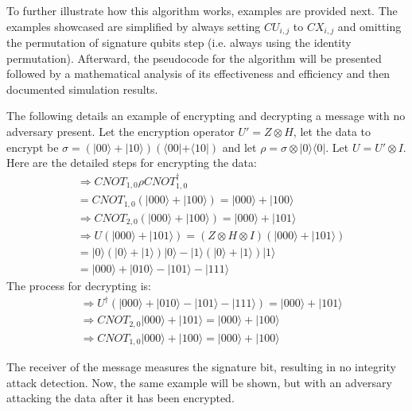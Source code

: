 To further illustrate how this algorithm works, examples are provided next. The examples showcased are simplified by always setting $\mathit{CU}_{i,j}$ to $\mathit{CX}_{i,j}$ and omitting the permutation of signature qubits step (i.e. always using the identity permutation). Afterward, the pseudocode for the algorithm will be presented followed by a mathematical analysis of its effectiveness and efficiency and then documented simulation results.

\begin{example}
\label{ex:EnhancedClifford1}
	The following details an example of encrypting and decrypting a message with no adversary present. Let the encryption operator $U' = Z \otimes H$, let the data to encrypt be $\sigma = (|00\rangle + |10\rangle) (\langle00| + \langle10|)$ and let $\rho = \sigma \otimes |0\rangle \langle0|$. Let $U = U' \otimes I$. Here are the detailed steps for encrypting the data:
	\begin{align}
	& \Rightarrow \mathit{CNOT}_{1,0}\rho \mathit{CNOT}_{1,0}^{\dagger} \\ 
	&= \mathit{CNOT}_{1,0}(|000\rangle + |100\rangle) = |000\rangle + |100\rangle\\
	& \Rightarrow \mathit{CNOT}_{2,0}(|000\rangle + |100\rangle) = |000\rangle + |101\rangle\\
	& \Rightarrow U(|000\rangle + |101\rangle) = (Z \otimes H \otimes I)(|000\rangle + |101\rangle)\\ 
	&= |0\rangle(|0\rangle + |1\rangle)|0\rangle - |1\rangle(|0\rangle + |1\rangle)|1\rangle\\
	&= |000\rangle + |010\rangle - |101\rangle - |111\rangle
	\end{align}
	The process for decrypting is:
	\begin{align}
	& \Rightarrow U^{\dagger}(|000\rangle + |010\rangle - |101\rangle - |111\rangle) = |000\rangle + |101\rangle\\ 
	& \Rightarrow \mathit{CNOT}_{2,0} |000\rangle + |101\rangle = |000\rangle + |100\rangle\\
	& \Rightarrow \mathit{CNOT}_{1,0} |000\rangle + |100\rangle = |000\rangle + |100\rangle
	\end{align}
\end{example}
The receiver of the message measures the signature bit, resulting in no integrity attack detection. Now, the same example will be shown, but with an adversary attacking the data after it has been encrypted.
